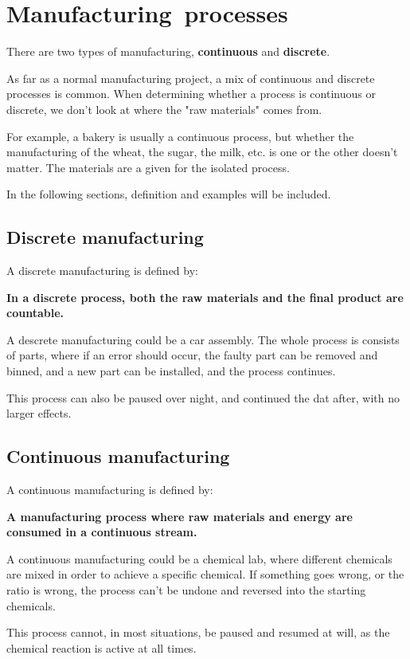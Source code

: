 \section{Manufacturing\ processes}
\begin{flushleft}
There are two types of manufacturing, \textbf{continuous} and \textbf{discrete}.

As far as a normal manufacturing project, a mix of continuous and discrete processes is common. When determining whether a process is continuous or discrete, we don't look at where the "raw materials" comes from.

For example, a bakery is usually a continuous process, but whether the manufacturing of the wheat, the sugar, the milk, etc. is one or the other doesn't matter. The materials are a given for the isolated process.

In the following sections, definition and examples will be included.
\end{flushleft}

\subsection{Discrete manufacturing}
\begin{flushleft}
A discrete manufacturing is defined by:
\begin{center}
\textbf{In a discrete process, both the raw materials and the final product are countable.}
\end{center}

A descrete manufacturing could be a car assembly. The whole process is consists of parts, where if an error should occur, the faulty part can be removed and binned, and a new part can be installed, and the process continues.

This process can also be paused over night, and continued the dat after, with no larger effects.
\end{flushleft}

\subsection{Continuous manufacturing}
\begin{flushleft}
A continuous manufacturing is defined by:

\begin{center}
\textbf{A manufacturing process where raw materials and energy are consumed in a continuous stream.}
\end{center}

A continuous manufacturing could be a chemical lab, where different chemicals are mixed in order to achieve a specific chemical. If something goes wrong, or the ratio is wrong, the process can't be undone and reversed into the starting chemicals.

This process cannot, in most situations, be paused and resumed at will, as the chemical reaction is active at all times.
\end{flushleft}
